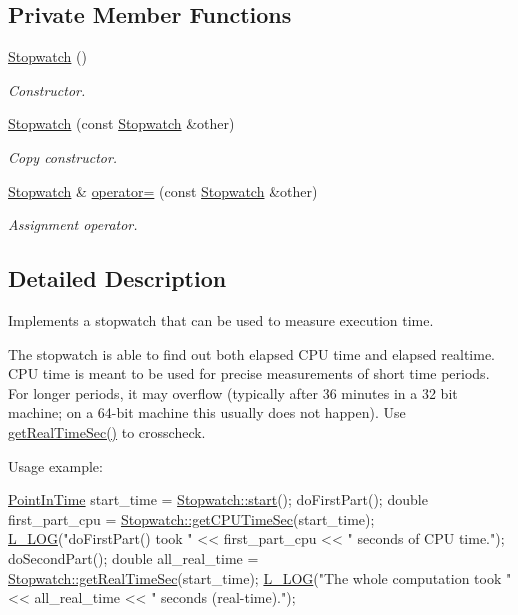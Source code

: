 \subsection*{Private Member Functions}
\begin{DoxyCompactItemize}
\item 
\hyperlink{classStopwatch_a628b5ebeed5df065dd847e68fb6336cf}{Stopwatch} ()
\begin{DoxyCompactList}\small\item\em Constructor. \end{DoxyCompactList}\item 
\hyperlink{classStopwatch_a53702b14c791136a2e333fad94fecbf0}{Stopwatch} (const \hyperlink{classStopwatch}{Stopwatch} \&other)
\begin{DoxyCompactList}\small\item\em Copy constructor. \end{DoxyCompactList}\item 
\hyperlink{classStopwatch}{Stopwatch} \& \hyperlink{classStopwatch_a70e4b31db345295ec12253d1f68dc288}{operator=} (const \hyperlink{classStopwatch}{Stopwatch} \&other)
\begin{DoxyCompactList}\small\item\em Assignment operator. \end{DoxyCompactList}\end{DoxyCompactItemize}


\subsection{Detailed Description}
Implements a stopwatch that can be used to measure execution time. 

The stopwatch is able to find out both elapsed C\-P\-U time and elapsed realtime. C\-P\-U time is meant to be used for precise measurements of short time periods. For longer periods, it may overflow (typically after 36 minutes in a 32 bit machine; on a 64-\/bit machine this usually does not happen). Use \hyperlink{classStopwatch_a700dbdfb01479ece147c15d149eba157}{get\-Real\-Time\-Sec()} to crosscheck.

Usage example\-: 
\begin{DoxyCode}
\hyperlink{Options_8h_af3a9f634f27bed7e98dbc23e5c6f807d}{PointInTime} start\_time = \hyperlink{classStopwatch_ae4e530c454d40a88256a76744d3d8a12}{Stopwatch::start}();
doFirstPart();
\textcolor{keywordtype}{double} first\_part\_cpu = \hyperlink{classStopwatch_a27dda7191760c2822e3aad879805e013}{Stopwatch::getCPUTimeSec}(start\_time);
\hyperlink{Logger_8h_a081139c373685d15bfc9f0afebe00542}{L\_LOG}(\textcolor{stringliteral}{"doFirstPart() took "} << first\_part\_cpu << \textcolor{stringliteral}{" seconds of CPU time."});
doSecondPart();
\textcolor{keywordtype}{double} all\_real\_time = \hyperlink{classStopwatch_a700dbdfb01479ece147c15d149eba157}{Stopwatch::getRealTimeSec}(start\_time);
\hyperlink{Logger_8h_a081139c373685d15bfc9f0afebe00542}{L\_LOG}(\textcolor{stringliteral}{"The whole computation took "} << all\_real\_time << \textcolor{stringliteral}{" seconds (real-time)."});
\end{DoxyCode}


